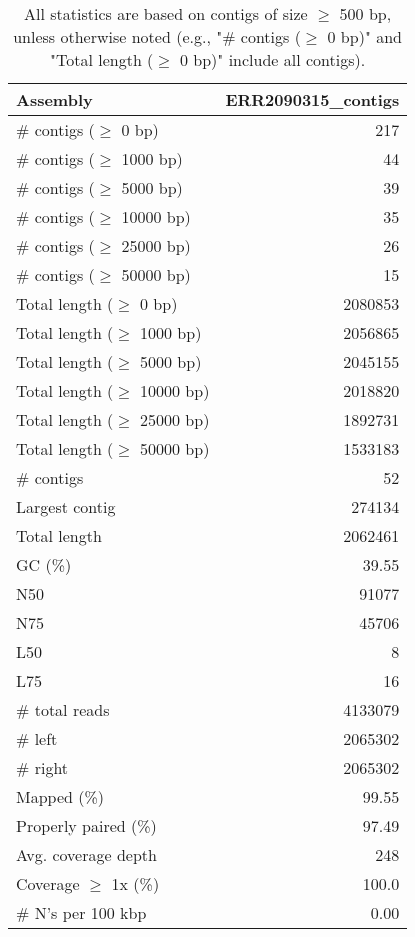 \documentclass[12pt,a4paper]{article}
\begin{document}
\begin{table}[ht]
\begin{center}
\caption{All statistics are based on contigs of size $\geq$ 500 bp, unless otherwise noted (e.g., "\# contigs ($\geq$ 0 bp)" and "Total length ($\geq$ 0 bp)" include all contigs).}
\begin{tabular}{|l*{1}{|r}|}
\hline
Assembly & ERR2090315\_contigs \\ \hline
\# contigs ($\geq$ 0 bp) & 217 \\ \hline
\# contigs ($\geq$ 1000 bp) & 44 \\ \hline
\# contigs ($\geq$ 5000 bp) & 39 \\ \hline
\# contigs ($\geq$ 10000 bp) & 35 \\ \hline
\# contigs ($\geq$ 25000 bp) & 26 \\ \hline
\# contigs ($\geq$ 50000 bp) & 15 \\ \hline
Total length ($\geq$ 0 bp) & 2080853 \\ \hline
Total length ($\geq$ 1000 bp) & 2056865 \\ \hline
Total length ($\geq$ 5000 bp) & 2045155 \\ \hline
Total length ($\geq$ 10000 bp) & 2018820 \\ \hline
Total length ($\geq$ 25000 bp) & 1892731 \\ \hline
Total length ($\geq$ 50000 bp) & 1533183 \\ \hline
\# contigs & 52 \\ \hline
Largest contig & 274134 \\ \hline
Total length & 2062461 \\ \hline
GC (\%) & 39.55 \\ \hline
N50 & 91077 \\ \hline
N75 & 45706 \\ \hline
L50 & 8 \\ \hline
L75 & 16 \\ \hline
\# total reads & 4133079 \\ \hline
\# left & 2065302 \\ \hline
\# right & 2065302 \\ \hline
Mapped (\%) & 99.55 \\ \hline
Properly paired (\%) & 97.49 \\ \hline
Avg. coverage depth & 248 \\ \hline
Coverage $\geq$ 1x (\%) & 100.0 \\ \hline
\# N's per 100 kbp & 0.00 \\ \hline
\end{tabular}
\end{center}
\end{table}
\end{document}
